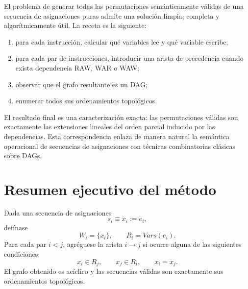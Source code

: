 \documentclass[letterpaper,oneside]{article}
\theoremstyle{remark}
\newcommand{\Vars}{\mathit{Vars}}
\newcommand{\reads}[1]{R_{#1}}
\newcommand{\writes}[1]{W_{#1}}
\begin{document}
El problema de generar todas las permutaciones semánticamente válidas de una secuencia de asignaciones puras admite una solución limpia, completa y algorítmicamente útil. La receta es la siguiente:
\begin{enumerate}[leftmargin=2.2em]
  \item para cada instrucción, calcular qué variables lee y qué variable escribe;
  \item para cada par de instrucciones, introducir una arista de precedencia cuando exista dependencia RAW, WAR o WAW;
  \item observar que el grafo resultante es un DAG;
  \item enumerar todos sus ordenamientos topológicos.
\end{enumerate}

El resultado final es una caracterización exacta: las permutaciones válidas son exactamente las extensiones lineales del orden parcial inducido por las dependencias. Esta correspondencia enlaza de manera natural la semántica operacional de secuencias de asignaciones con técnicas combinatorias clásicas sobre DAGs.

\appendix
\section{Resumen ejecutivo del método}

Dada una secuencia de asignaciones
\[
  s_i \equiv x_i := e_i,
\]
defínase
\[
  \writes{i}=\{x_i\},
  \qquad
  \reads{i}=\Vars(e_i).
\]
Para cada par $i<j$, agréguese la arista $i \to j$ si ocurre alguna de las siguientes condiciones:
\[
  x_i \in \reads{j},
  \qquad
  x_j \in \reads{i},
  \qquad
  x_i = x_j.
\]
El grafo obtenido es acíclico y las secuencias válidas son exactamente sus ordenamientos topológicos.
\end{document}

